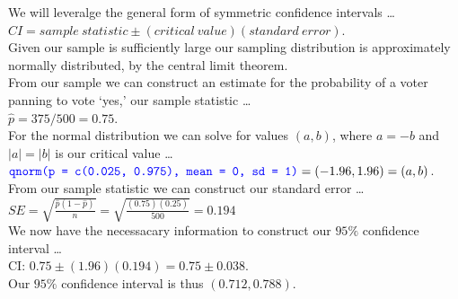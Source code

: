 \documentclass[12pt]{article}
\newcommand{\XBB}{\color{blue}}
\newcommand{\ds}{\displaystyle}
\begin{document}
\noindent
We will leveralge the general form of symmetric confidence intervals \dots \\

$ \ds CI = sample \ statistic \pm (critical \ value) (standard \ error) $.  \\

\noindent
Given our sample is sufficiently large our sampling distribution is approximately normally distributed, by the central limit theorem. \\

\noindent
From our sample we can construct an estimate for the probability of a voter panning to vote `yes,' our sample statistic \dots \\

$ \hat{p} = 375/500 = 0.75 $. \\

\noindent
For the normal distribution we can solve for values $ (a,b) $, where $ a = -b $ and $ | a | = | b | $ is our critical value \dots \\

$ \ds {\XBB \texttt{qnorm(p = c(0.025, 0.975), mean = 0, sd = 1)}} = (-1.96, 1.96) = (a, b) $. \\

\noindent
From our sample statistic we can construct our standard error \dots \\

$ \ds SE = \sqrt{ \ds \frac{\hat{p}(1 - \hat{p})}{n}} = \sqrt{ \ds \frac{(0.75)(0.25)}{500}} = 0.194 $ \\

\noindent
We now have the necessacary information to construct our $ 95\% $ confidence interval \dots \\

CI: $ 0.75 \pm (1.96)(0.194) = 0.75 \pm 0.038 $. \\

\noindent
Our $ 95\% $ confidence interval is thus $ (0.712, 0.788) $.
\end{document}
